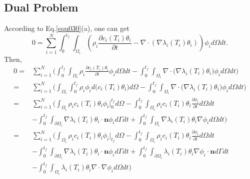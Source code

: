 \documentclass[UTF-8]{article}
\begin{document}
\subsection{Dual Problem}
According to Eq.\ref{equ030}(a), one can get
\begin{equation*}
	0 = \sum_{i=1}^N \int_0^{t_f} \int_{\Omega_i} \left( \rho_i \frac{\partial c_i(T_i)\theta_i}{\partial t} - \nabla \cdot \left( \nabla \lambda_i(T_i) \theta_i \right) \right) \phi_i d\Omega dt.
\end{equation*}
Then,
\begin{align}
	0 =& \sum_{i=1}^N \bigg( \int_0^{t_f} \int_{\Omega_i} \rho_i \frac{\partial c_i(T_i)\theta_i}{\partial t} \phi_i d\Omega dt - \int_0^{t_f} \int_{\Omega_i} \nabla \cdot \big( \nabla \lambda_i(T_i) \theta_i \big) \phi_i d\Omega dt \bigg) \nonumber \\
	=& \sum_{i=1}^N \bigg( \int_{\Omega_i} \int_0^{t_f} \rho_i \phi_i d \big( c_i(T_i)\theta_i \big) d\Omega - \int_0^{t_f} \int_{\Omega_i} \nabla \cdot \big( \nabla \lambda_i(T_i) \theta_i \big) \phi_i d\Omega dt \bigg) \nonumber \\
	=& \sum_{i=1}^N \bigg( \int_{\Omega_i} \rho_i c_i(T_i)\theta_i \phi_i \big|_0^{t_f} d\Omega - \int_0^{t_f} \int_{\Omega_i} \rho_i c_i(T_i)\theta_i \frac{\partial \phi_i}{\partial t} d\Omega dt \nonumber \\
	&- \int_0^{t_f} \int_{\partial \Omega_i} \nabla \lambda_i(T_i) \theta_i \cdot \pmb{n} \phi_i d\Gamma dt + \int_0^{t_f} \int_{\Omega_i} \nabla \lambda_i(T_i) \theta_i \nabla \phi_i d\Omega dt \bigg) \nonumber \\
	=& \sum_{i=1}^N \bigg( \int_{\Omega_i} \rho_i c_i(T_i)\theta_i \phi_i \big|_{t_f} d\Omega - \int_0^{t_f} \int_{\Omega_i} \rho_i c_i(T_i)\theta_i \frac{\partial \phi_i}{\partial t} d\Omega dt \nonumber \\
	&- \int_0^{t_f} \int_{\partial \Omega_i} \nabla \lambda_i(T_i) \theta_i \cdot \pmb{n} \phi_i d\Gamma dt + \int_0^{t_f} \int_{\partial \Omega_i} \lambda_i(T_i) \theta_i \nabla \phi_i \cdot \pmb{n} d\Gamma dt \nonumber \\
	&- \int_0^{t_f} \int_{\Omega_i} \lambda_i(T_i) \theta_i \nabla \cdot \nabla \phi_i d\Omega dt \bigg) \nonumber 
\end{align}
\end{document}
